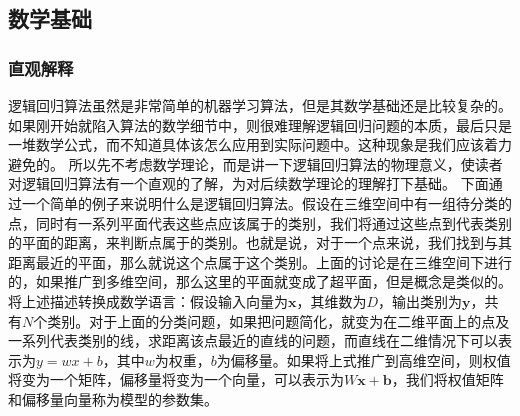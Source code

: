 \documentclass[UTF8]{article}
\begin{document}
\subsection{数学基础}
\subsubsection{直观解释}
逻辑回归算法虽然是非常简单的机器学习算法，但是其数学基础还是比较复杂的。如果刚开始就陷入算法的数学细节中，则很难理解逻辑回归问题的本质，最后只是一堆数学公式，而不知道具体该怎么应用到实际问题中。这种现象是我们应该着力避免的。\newline
所以先不考虑数学理论，而是讲一下逻辑回归算法的物理意义，使读者对逻辑回归算法有一个直观的了解，为对后续数学理论的理解打下基础。\newline
下面通过一个简单的例子来说明什么是逻辑回归算法。假设在三维空间中有一组待分类的点，同时有一系列平面代表这些点应该属于的类别，我们将通过这些点到代表类别的平面的距离，来判断点属于的类别。也就是说，对于一个点来说，我们找到与其距离最近的平面，那么就说这个点属于这个类别。上面的讨论是在三维空间下进行的，如果推广到多维空间，那么这里的平面就变成了超平面，但是概念是类似的。\newline
将上述描述转换成数学语言：假设输入向量为$\boldsymbol{x}$，其维数为$D$，输出类别为$\boldsymbol{y}$，共有$N$个类别。对于上面的分类问题，如果把问题简化，就变为在二维平面上的点及一系列代表类别的线，求距离该点最近的直线的问题，而直线在二维情况下可以表示为$y=wx + b$，其中$w$为权重，$b$为偏移量。如果将上式推广到高维空间，则权值将变为一个矩阵，偏移量将变为一个向量，可以表示为$W\boldsymbol{x} + \boldsymbol{b}$，我们将权值矩阵和偏移量向量称为模型的参数集。
\end{document}
